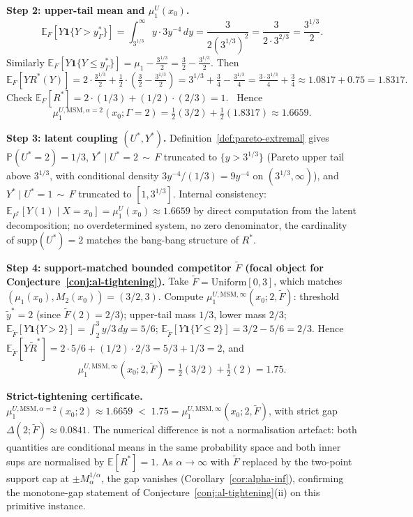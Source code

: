\documentclass[11pt]{article}
\newcommand{\E}{\mathbb{E}}
\renewcommand{\Pr}{\mathbb{P}}
\theoremstyle{definition}
\theoremstyle{plain}
\theoremstyle{remark}
\begin{document}
\textbf{Step 2: upper-tail mean and $\mu_1^U(x_0)$.}
\[ \E_F[Y \mathbf{1}\{Y > y_\Gamma^*\}] = \int_{3^{1/3}}^\infty y \cdot 3 y^{-4} \, dy = \frac{3}{2 (3^{1/3})^2} = \frac{3}{2 \cdot 3^{2/3}} = \frac{3^{1/3}}{2}. \]
Similarly $\E_F[Y \mathbf{1}\{Y \le y_\Gamma^*\}] = \mu_1 - \frac{3^{1/3}}{2} = \frac{3}{2} - \frac{3^{1/3}}{2}$. Then
\[ \E_F[Y R^*(Y)] = 2 \cdot \tfrac{3^{1/3}}{2} + \tfrac{1}{2} \cdot (\tfrac{3}{2} - \tfrac{3^{1/3}}{2}) = 3^{1/3} + \tfrac{3}{4} - \tfrac{3^{1/3}}{4} = \tfrac{3 \cdot 3^{1/3}}{4} + \tfrac{3}{4} \approx 1.0817 + 0.75 = 1.8317. \]
Check $\E_F[R^*] = 2 \cdot (1/3) + (1/2) \cdot (2/3) = 1$. \checkmark\ Hence
\[ \mu_1^{U, \mathrm{MSM}, \alpha=2}(x_0; \Gamma=2) = \tfrac{1}{2}(3/2) + \tfrac{1}{2}(1.8317) \approx 1.6659. \]

\textbf{Step 3: latent coupling $(U^*, Y^*)$.} Definition~\ref{def:pareto-extremal} gives $\Pr(U^* = 2) = 1/3$, $Y^* \mid U^* = 2 \,\sim\, F$ truncated to $\{y > 3^{1/3}\}$ (Pareto upper tail above $3^{1/3}$, with conditional density $3 y^{-4} / (1/3) = 9 y^{-4}$ on $(3^{1/3}, \infty)$), and $Y^* \mid U^* = 1 \,\sim\, F$ truncated to $[1, 3^{1/3}]$. Internal consistency: $\E_{P^*}[Y(1) \mid X = x_0] = \mu_1^U(x_0) \approx 1.6659$ by direct computation from the latent decomposition; no overdetermined system, no zero denominator, the cardinality of $\mathrm{supp}(U^*) = 2$ matches the bang-bang structure of $R^*$.

\textbf{Step 4: support-matched bounded competitor $\tilde F$ (focal object for Conjecture~\ref{conj:al-tightening}).} Take $\tilde F = \mathrm{Uniform}[0, 3]$, which matches $(\mu_1(x_0), M_2(x_0)) = (3/2, 3)$. Compute $\mu_1^{U, \mathrm{MSM}, \infty}(x_0; 2, \tilde F)$: threshold $\tilde y^* = 2$ (since $\tilde F(2) = 2/3$); upper-tail mass $1/3$, lower mass $2/3$; $\E_{\tilde F}[Y \mathbf{1}\{Y > 2\}] = \int_2^3 y/3\,dy = 5/6$; $\E_{\tilde F}[Y \mathbf{1}\{Y \le 2\}] = 3/2 - 5/6 = 2/3$. Hence $\E_{\tilde F}[Y \tilde R^*] = 2 \cdot 5/6 + (1/2) \cdot 2/3 = 5/3 + 1/3 = 2$, and
\[ \mu_1^{U, \mathrm{MSM}, \infty}(x_0; 2, \tilde F) = \tfrac{1}{2}(3/2) + \tfrac{1}{2}(2) = 1.75. \]

\textbf{Strict-tightening certificate.} $\mu_1^{U, \mathrm{MSM}, \alpha=2}(x_0; 2) \approx 1.6659 \;<\; 1.75 = \mu_1^{U, \mathrm{MSM}, \infty}(x_0; 2, \tilde F)$, with strict gap $\Delta(2; \tilde F) \approx 0.0841$. The numerical difference is not a normalisation artefact: both quantities are conditional means in the same probability space and both inner sups are normalised by $\E[R^*] = 1$. As $\alpha \to \infty$ with $\tilde F$ replaced by the two-point support cap at $\pm M_\alpha^{1/\alpha}$, the gap vanishes (Corollary~\ref{cor:alpha-inf}), confirming the monotone-gap statement of Conjecture~\ref{conj:al-tightening}(ii) on this primitive instance.
\end{document}
